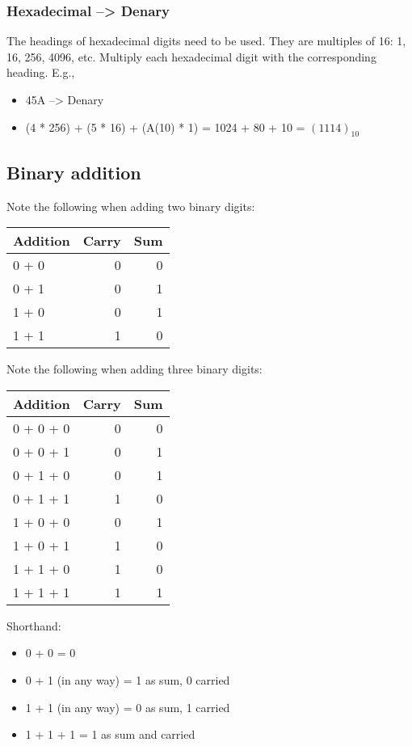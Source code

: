 \documentclass[11pt]{article}
\begin{document}
\subsubsection{Hexadecimal --> Denary}
\label{sec:org796eb63}
The headings of hexadecimal digits need to be used. They are multiples of 16: 1, 16, 256, 4096, etc. Multiply each hexadecimal digit with the corresponding heading. E.g.,
\begin{itemize}
\item 45A --> Denary
\item (4 * 256) + (5 * 16) + (A(10) * 1) = 1024 + 80 + 10 = \((1114)_{10}\)
\end{itemize}
\subsection{Binary addition}
\label{sec:org9b24ebb}
Note the following when adding two binary digits:
\begin{center}
\begin{tabular}{lrr}
Addition & Carry & Sum\\
\hline
0 + 0 & 0 & 0\\
0 + 1 & 0 & 1\\
1 + 0 & 0 & 1\\
1 + 1 & 1 & 0\\
\end{tabular}
\end{center}
Note the following when adding three binary digits:
\begin{center}
\begin{tabular}{lrr}
Addition & Carry & Sum\\
\hline
0 + 0 + 0 & 0 & 0\\
0 + 0 + 1 & 0 & 1\\
0 + 1 + 0 & 0 & 1\\
0 + 1 + 1 & 1 & 0\\
1 + 0 + 0 & 0 & 1\\
1 + 0 + 1 & 1 & 0\\
1 + 1 + 0 & 1 & 0\\
1 + 1 + 1 & 1 & 1\\
\end{tabular}
\end{center}
Shorthand:
\begin{itemize}
\item 0 + 0 = 0
\item 0 + 1 (in any way) = 1 as sum, 0 carried
\item 1 + 1 (in any way) = 0 as sum, 1 carried
\item 1 + 1 + 1 = 1 as sum and carried
\end{itemize}
\end{document}
